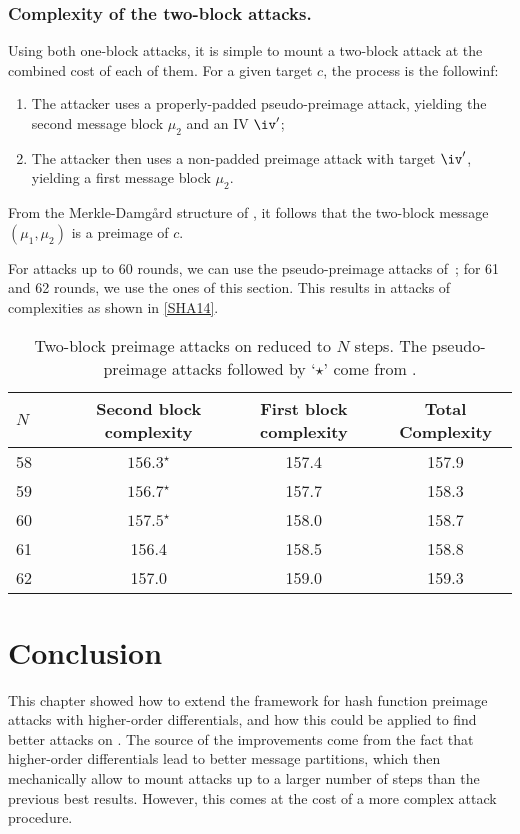   \subsubsection{Complexity of the two-block attacks.}
  Using both one-block attacks, it is simple to mount a two-block attack at the combined cost of each of them.
  For a given target $c$, the process is the followinf:
    \begin{enumerate}
      \item The attacker uses a properly-padded pseudo-preimage attack, yielding the second message block $\mu_2$ and an IV $\iv'$;
      \item The attacker then uses a non-padded preimage attack with target $\iv'$, yielding a first message block $\mu_2$.
    \end{enumerate}
From the Merkle-Damg\aa rd structure of \shaone, it follows that the two-block message $(\mu_1, \mu_2)$ 
    is a preimage of $c$.

    For attacks up to 60 rounds, we can use the pseudo-preimage attacks of~\cite{DBLP:conf/crypto/KnellwolfK12}; for 61 and 62 rounds,
    we use the ones of this section. This results in attacks of complexities as shown in \autoref{SHA14}.

  \begin{table}[t]
    \caption[Two-block preimage.]{Two-block preimage attacks on \shaone reduced to $N$ steps. The pseudo-preimage attacks followed by
    `$\star$' come from \cite{DBLP:conf/crypto/KnellwolfK12}.\label{SHA14}}
    \begin{center}
      \begin{tabular}{l c c c } \toprule
        $N\qquad$ & Second block complexity\phantom{bla} & First block complexity\phantom{bla}  & Total Complexity \\\midrule
        58    & $156.3^\star$ & 157.4& 157.9\\ 
        59    & $156.7^\star$ & 157.7& 158.3\\ 
        60    & $157.5^\star$ & 158.0& 158.7\\ 
        61    & 156.4    & 158.5& 158.8\\ 
        62    & 157.0    & 159.0& 159.3\\ 
        \bottomrule
        \hline
      \end{tabular}
    \end{center}
  \end{table}

\section{Conclusion}
This chapter showed how to extend the \mitm framework for hash function preimage attacks with higher-order differentials,
and how this could be applied to find better attacks on \shaone.
The source of the improvements come from the fact that higher-order differentials lead to better message partitions, which
then mechanically allow to mount attacks up to a larger number of steps than the previous best
results. However, this comes at the cost of a more complex attack procedure.
